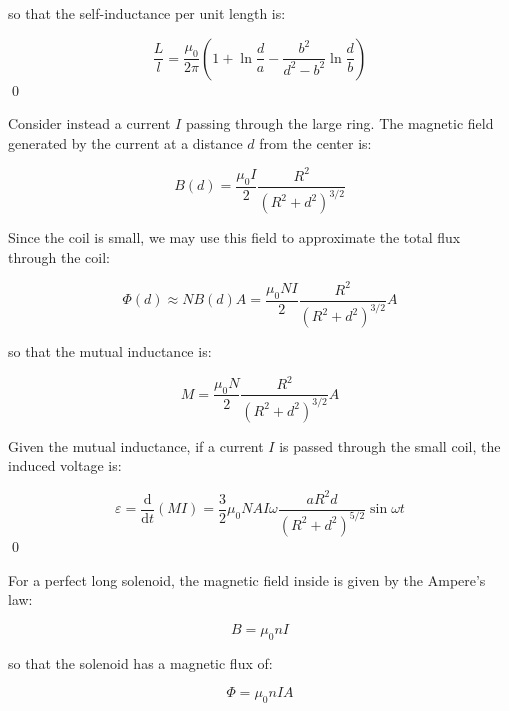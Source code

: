 \documentclass[12pt]{article}
\begin{document}
so that the self-inductance per unit length is:

\begin{equation}
    \frac{L}{l} = \frac{\mu_{0}}{2\pi} \left( 1 + \ln{\frac{d}{a}} - \frac{b^{2}}{d^{2} - b^{2}} \ln{\frac{d}{b}} \right)
\end{equation}
\qed



Consider instead a current $I$ passing through the large ring. The magnetic field generated by the current at a distance $d$ from the center is:

\begin{equation}
    B(d) = \frac{\mu_{0}I}{2} \frac{R^{2}}{(R^{2} + d^{2})^{3/2}}
\end{equation}

Since the coil is small, we may use this field to approximate the total flux through the coil:

\begin{equation}
    \Phi(d) \approx NB(d)A = \frac{\mu_{0}NI}{2} \frac{R^{2}}{(R^{2} + d^{2})^{3/2}} A
\end{equation}

so that the mutual inductance is:

\begin{equation}
    M = \frac{\mu_{0}N}{2} \frac{R^{2}}{(R^{2} + d^{2})^{3/2}} A
\end{equation}

Given the mutual inductance, if a current $I$ is passed through the small coil, the induced voltage is:

\begin{equation}
    \varepsilon = \frac{\mathrm{d}}{\mathrm{d}t} \left( M I \right) = \frac{3}{2} \mu_{0}NAI \omega \frac{aR^{2}d}{(R^{2} + d^{2})^{5/2}} \sin{\omega t}
\end{equation}
\qed



For a perfect long solenoid, the magnetic field inside is given by the Ampere's law:

\begin{equation}
    B = \mu_{0} nI
\end{equation}

so that the solenoid has a magnetic flux of:

\begin{equation}
    \Phi = \mu_{0} nI A
\end{equation}
\end{document}
